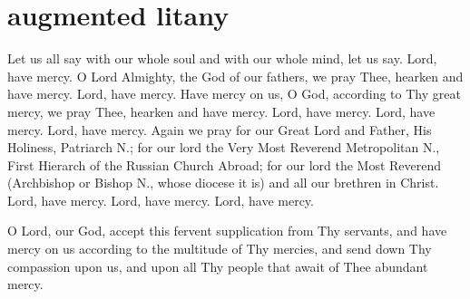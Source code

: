 \section{augmented litany}

\begin{liturgicaltext}
    \deacon Let us all say with our whole soul and with our whole mind, let us say.
    \choir Lord, have mercy.
    \deacon O Lord Almighty, the God of our fathers, we pray Thee, hearken and have mercy.
    \choir Lord, have mercy.
    \deacon Have mercy on us, O God, according to Thy great mercy, we pray Thee, hearken and have mercy.
    \choir Lord, have mercy. Lord, have mercy. Lord, have mercy.
    \deacon Again we pray for our Great Lord and Father, His Holiness, Patriarch N.; for our lord the Very Most Reverend Metropolitan N., First Hierarch of the Russian Church Abroad; for our lord the Most Reverend (Archbishop or Bishop N., whose diocese it is) and all our brethren in Christ.
    \choirsemisecret Lord, have mercy. Lord, have mercy. Lord, have mercy. 
\end{liturgicaltext}
\begin{semisecret}
    \begin{secretprayer}
        O Lord, our God, accept this fervent supplication from Thy servants, and have mercy on us according to the multitude of Thy mercies, and send down Thy compassion upon us, and upon all Thy people that await of Thee abundant mercy.
    \end{secretprayer}
\end{semisecret}
